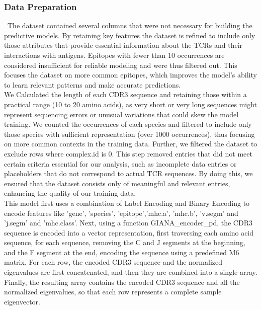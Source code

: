 \documentclass[conference]{IEEEtran}
\begin{document}
	\subsubsection{Data Preparation} \
    The dataset contained several columns that were not necessary for building the predictive models. By retaining key features the dataset is refined to include only those attributes that provide essential information about the TCRs and their interactions with antigens. Epitopes with fewer than 10 occurrences are considered insufficient for reliable modeling and were thus filtered out. This focuses the dataset on more common epitopes, which improves the model's ability to learn relevant patterns and make accurate predictions.
    \\
    
    We Calculated the length of each CDR3 sequence and retaining those within a practical range (10 to 20 amino acids), as very short or very long sequences might represent sequencing errors or unusual variations that could skew the model training. We counted the occurrences of each species and filtered to include only those species with sufficient representation (over 1000 occurrences), thus focusing on more common contexts in the training data. Further, we filtered the dataset to exclude rows where complex.id is 0. This step removed entries that did not meet certain criteria essential for our analysis, such as incomplete data entries or placeholders that do not correspond to actual TCR sequences. By doing this, we ensured that the dataset consists only of meaningful and relevant entries, enhancing the quality of our training data.
	\\
 
    This model first uses a combination of Label Encoding and Binary Encoding to encode features like 'gene', 'species', 'epitope','mhc.a', 'mhc.b', 'v.segm' and 'j.segm' and 'mhc.class'. Next, using a function GIANA\_encoder\_pd, the CDR3 sequence is encoded into a vector representation, first traversing each amino acid sequence, for each sequence, removing the C and J segments at the beginning, and the F segment at the end, encoding the sequence using a predefined M6 matrix. For each row, the encoded CDR3 sequence and the normalized eigenvalues are first concatenated, and then they are combined into a single array. Finally, the resulting array contains the encoded CDR3 sequence and all the normalized eigenvalues, so that each row represents a complete sample eigenvector.
    \\
\end{document}
